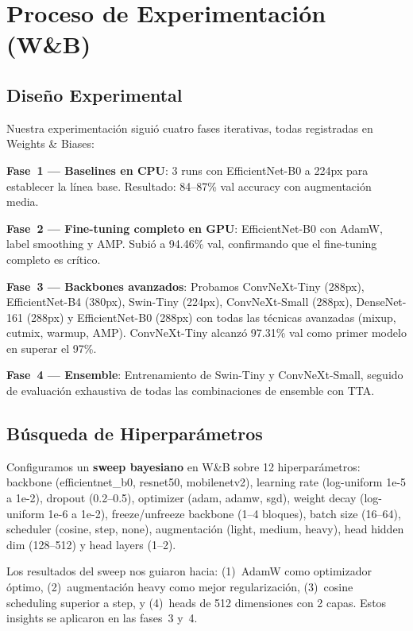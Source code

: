 \documentclass[10pt,a4paper,twocolumn]{article}
\begin{document}
\section{Proceso de Experimentación (W\&B)}

\subsection{Diseño Experimental}

Nuestra experimentación siguió cuatro fases iterativas, todas registradas en Weights \& Biases:

\textbf{Fase~1 --- Baselines en CPU}: 3 runs con EfficientNet-B0 a 224px para establecer la línea base. Resultado: 84--87\% val accuracy con augmentación media.

\textbf{Fase~2 --- Fine-tuning completo en GPU}: EfficientNet-B0 con AdamW, label smoothing y AMP. Subió a 94.46\% val, confirmando que el fine-tuning completo es crítico.

\textbf{Fase~3 --- Backbones avanzados}: Probamos ConvNeXt-Tiny (288px), EfficientNet-B4 (380px), Swin-Tiny (224px), ConvNeXt-Small (288px), DenseNet-161 (288px) y EfficientNet-B0 (288px) con todas las técnicas avanzadas (mixup, cutmix, warmup, AMP). ConvNeXt-Tiny alcanzó 97.31\% val como primer modelo en superar el 97\%.

\textbf{Fase~4 --- Ensemble}: Entrenamiento de Swin-Tiny y ConvNeXt-Small, seguido de evaluación exhaustiva de todas las combinaciones de ensemble con TTA.

\subsection{Búsqueda de Hiperparámetros}

Configuramos un \textbf{sweep bayesiano} en W\&B sobre 12 hiperparámetros: backbone (efficientnet\_b0, resnet50, mobilenetv2), learning rate (log-uniform 1e-5 a 1e-2), dropout (0.2--0.5), optimizer (adam, adamw, sgd), weight decay (log-uniform 1e-6 a 1e-2), freeze/unfreeze backbone (1--4 bloques), batch size (16--64), scheduler (cosine, step, none), augmentación (light, medium, heavy), head hidden dim (128--512) y head layers (1--2).

Los resultados del sweep nos guiaron hacia: (1)~AdamW como optimizador óptimo, (2)~augmentación heavy como mejor regularización, (3)~cosine scheduling superior a step, y (4)~heads de 512 dimensiones con 2 capas. Estos insights se aplicaron en las fases~3 y~4.
\end{document}

